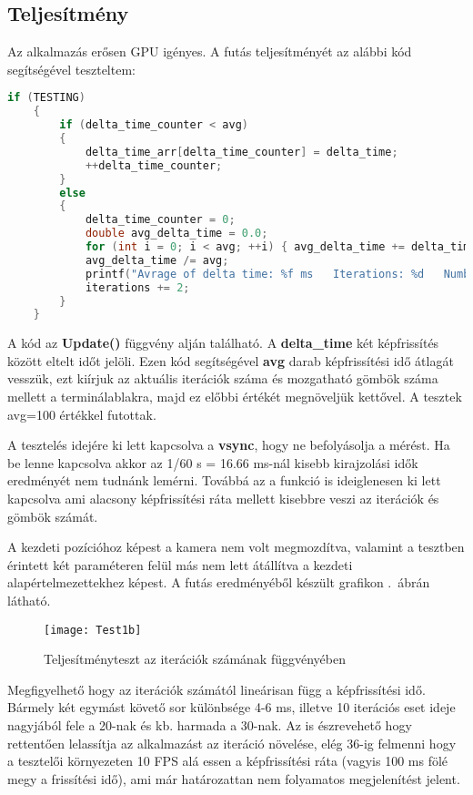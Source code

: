 \subsection{Teljesítmény}

Az alkalmazás erősen GPU igényes.  A futás teljesítményét az alábbi kód segítségével teszteltem:
\begin{lstlisting}[language={C++}]
if (TESTING)
	{
		if (delta_time_counter < avg)
		{
			delta_time_arr[delta_time_counter] = delta_time;
			++delta_time_counter;
		}
		else
		{
			delta_time_counter = 0;
			double avg_delta_time = 0.0;
			for (int i = 0; i < avg; ++i) { avg_delta_time += delta_time_arr[i]; }
			avg_delta_time /= avg;
			printf("Avrage of delta time: %f ms   Iterations: %d   Number of spheres: %d \n", avg_delta_time*1000, iterations, ballCount);
			iterations += 2;
		}
	}
\end{lstlisting}

A kód az \textbf{Update()} függvény alján található. A \textbf{delta\_time} két képfrissítés között eltelt időt jelöli. Ezen kód segítségével \textbf{avg} darab képfrissítési idő átlagát vesszük, ezt kiírjuk az aktuális iterációk száma és mozgatható gömbök száma mellett a terminálablakra, majd ez előbbi értékét megnöveljük kettővel. A tesztek avg=100 értékkel futottak.

A tesztelés idejére ki lett kapcsolva a \textbf{vsync}, hogy ne befolyásolja a mérést. Ha be lenne kapcsolva akkor az 1/60 s = 16.66 ms-nál kisebb kirajzolási idők eredményét nem tudnánk lemérni. Továbbá az a funkció is ideiglenesen ki lett kapcsolva ami alacsony képfrissítési ráta mellett kisebbre veszi az iterációk és gömbök számát.

A kezdeti pozícióhoz képest a kamera nem volt megmozdítva, valamint a tesztben érintett két paraméteren felül más nem lett átállítva a kezdeti alapértelmezettekhez képest. A futás eredményéből készült grafikon .~ábrán látható.

\begin{figure}[H]
	\centering
	\texttt{[image: Test1b]}
	\caption{Teljesítményteszt az iterációk számának függvényében}
	\label{fig:Test1}
\end{figure}


Megfigyelhető hogy az iterációk számától lineárisan függ a képfrissítési idő. Bármely két egymást követő sor különbsége 4-6 ms, illetve 10 iterációs eset ideje nagyjából fele a 20-nak és kb. harmada a 30-nak. Az is észrevehető hogy rettentően lelassítja az alkalmazást az iteráció növelése, elég 36-ig felmenni hogy a tesztelői környezeten 10 FPS alá essen a képfrissítési ráta (vagyis 100 ms fölé megy a frissítési idő), ami már határozattan nem folyamatos megjelenítést jelent.

